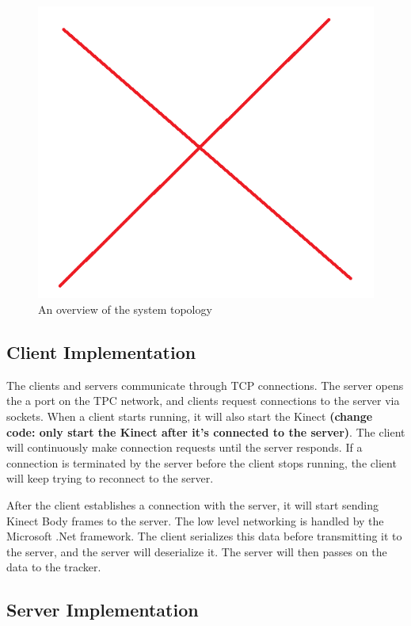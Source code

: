 \documentclass{sigchi}
\begin{document}
\begin{figure}[!h]
  \centering
  \includegraphics[width=0.9\columnwidth]{system_architecture}
  \caption{An overview of the system topology}
  \label{fig:system_architecture}
\end{figure}

\subsection{Client Implementation}

The clients and servers communicate through TCP connections. The server opens the a port on the TPC network, and clients request connections to the server via sockets. When a client starts running, it will also start the Kinect \textbf{(change code: only start the Kinect after it's connected to the server)}. The client will continuously make connection requests until the server responds. If a connection is terminated by the server before the client stops running, the client will keep trying to reconnect to the server.

After the client establishes a connection with the server, it will start sending Kinect Body frames to the server. The low level networking is handled by the Microsoft .Net framework. The client serializes this data before transmitting it to the server, and the server will deserialize it. The server will then passes on the data to the tracker.

\subsection{Server Implementation}
\end{document}
